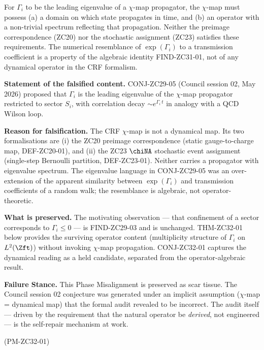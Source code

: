 \documentclass[12pt, a4paper]{article}
\begin{document}
For $\Gamma_i$ to be the leading eigenvalue of a $\chi$-map
propagator, the $\chi$-map must possess (a) a domain on which
state propagates in time, and (b) an operator with a non-trivial
spectrum reflecting that propagation. Neither the preimage
correspondence (ZC20) nor the stochastic assignment (ZC23)
satisfies these requirements. The numerical resemblance of
$\exp(\Gamma_i)$ to a transmission coefficient is a property
of the algebraic identity FIND-ZC31-01, not of any dynamical
operator in the CRF formalism.

\begin{openqbox}[title={PM-ZC32-01: $\chi$-map mis-attribution
  in CONJ-ZC29-05}]
\textbf{Statement of the falsified content.}
CONJ-ZC29-05 (Council session 02, May 2026) proposed that
$\Gamma_i$ is the leading eigenvalue of the $\chi$-map
propagator restricted to sector $S_i$, with correlation
decay $\sim e^{\Gamma_i\,t}$ in analogy with a QCD Wilson loop.

\textbf{Reason for falsification.}
The CRF $\chi$-map is not a dynamical map. Its two
formalisations are (i) the ZC20 preimage correspondence
(static gauge-to-charge map, DEF-ZC20-01), and (ii) the ZC23
$\chiNA$ stochastic event assignment (single-step
Bernoulli partition, DEF-ZC23-01). Neither carries a
propagator with eigenvalue spectrum. The eigenvalue language
in CONJ-ZC29-05 was an over-extension of the apparent
similarity between $\exp(\Gamma_i)$ and transmission
coefficients of a random walk; the resemblance is
algebraic, not operator-theoretic.

\textbf{What is preserved.}
The motivating observation --- that confinement of a sector
corresponds to $\Gamma_i \leq 0$ --- is FIND-ZC29-03 and is
unchanged. THM-ZC32-01 below provides the surviving operator
content (multiplicity structure of $\Gamma_i$ on $L^2(\Zft)$)
without invoking $\chi$-map propagation. CONJ-ZC32-01
captures the dynamical reading as a held candidate, separated
from the operator-algebraic result.

\textbf{Failure Stance.} This Phase Misalignment is preserved
as scar tissue. The Council session 02 conjecture was
generated under an implicit assumption ($\chi$-map = dynamical
map) that the formal audit revealed to be incorrect. The
audit itself --- driven by the requirement that the natural
operator be \emph{derived}, not engineered --- is the
self-repair mechanism at work.

\hfill\textup{(PM-ZC32-01)}
\end{openqbox}
\end{document}
